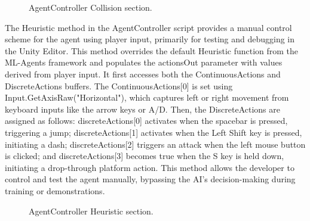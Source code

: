 \documentclass[12pt,oneside,openright,a4paper]{cpe-english-project}
\begin{document}
 \begin{figure}[!h]
 \centering
\caption{AgentController Collision section.}\label{fig:collision}
\end{figure}
\newpage
The Heuristic method in the AgentController script provides a manual control scheme for the agent using player input, primarily for testing and debugging in the Unity Editor. This method overrides the default Heuristic function from the ML-Agents framework and populates the actionsOut parameter with values derived from player input. It first accesses both the ContinuousActions and DiscreteActions buffers. The ContinuousActions[0] is set using Input.GetAxisRaw("Horizontal"), which captures left or right movement from keyboard inputs like the arrow keys or A/D. Then, the DiscreteActions are assigned as follows: discreteActions[0] activates when the spacebar is pressed, triggering a jump; discreteActions[1] activates when the Left Shift key is pressed, initiating a dash; discreteActions[2] triggers an attack when the left mouse button is clicked; and discreteActions[3] becomes true when the S key is held down, initiating a drop-through platform action. This method allows the developer to control and test the agent manually, bypassing the AI’s decision-making during training or demonstrations.\par
 \begin{figure}[!h]
 \centering
\caption{AgentController Heuristic section.}\label{fig:heuristic}
\end{figure}
\end{document}
